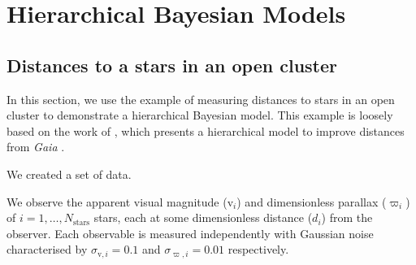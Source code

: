 %
%
%
%
%
\chapter{Hierarchical Bayesian Models}


\section[Stellar distances]{Distances to a stars in an open cluster}

\newcommand{\appmag}{\ensuremath{\mathrm{v}}}
\newcommand{\absmag}{\ensuremath{\mathrm{V}}}

In this section, we use the example of measuring distances to stars in an open cluster to demonstrate a hierarchical Bayesian model. This example is loosely based on the work of \citet{Leistedt.Hogg2017}, which presents a hierarchical model to improve distances from \emph{Gaia} \citep{GaiaCollaboration.Prusti.ea2016}.

We created a set of data.

\begin{table}[tb]
    \centering
    \caption{}
    \label{tab:hbm-data}
    
\end{table}

We observe the apparent visual magnitude (\(\appmag_i\)) and dimensionless parallax (\(\varpi_i\)) of \(i = 1,\dots,N_\mathrm{stars}\) stars, each at some dimensionless distance (\(d_i\)) from the observer. Each observable is measured independently with Gaussian noise characterised by \(\sigma_{\appmag,i} = 0.1\) and \(\sigma_{\varpi,i} = 0.01\) respectively.

